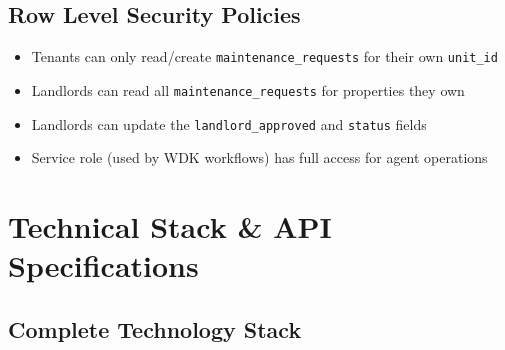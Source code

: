 \documentclass[12pt,a4paper]{article}
\begin{document}
\subsection{Row Level Security Policies}

\begin{itemize}
    \item Tenants can only read/create \texttt{maintenance\_requests} for their own \texttt{unit\_id}
    \item Landlords can read all \texttt{maintenance\_requests} for properties they own
    \item Landlords can update the \texttt{landlord\_approved} and \texttt{status} fields
    \item Service role (used by WDK workflows) has full access for agent operations
\end{itemize}

\section{Technical Stack \& API Specifications}

\subsection{Complete Technology Stack}
\end{document}
